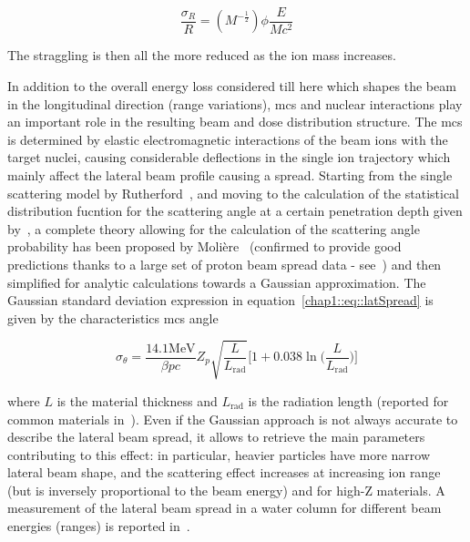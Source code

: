  \begin{equation}
\frac{\sigma_{R}}{R} = (M^{-\frac{1}{2}})\phi\frac{E}{Mc^{2}}
\label{chap1::eq::relStragg}
\end{equation}

The straggling is then all the more reduced as the ion mass increases.

In addition to the overall energy loss considered till here which shapes the beam in the longitudinal direction (range variations),  \gls{mcs} and nuclear interactions play an important role in the resulting beam and dose distribution structure. The \gls{mcs} is determined by elastic electromagnetic interactions of the beam ions with the target nuclei, causing considerable deflections in the single ion trajectory which mainly affect the lateral beam profile causing a spread. Starting from the single scattering model by Rutherford~\parencite{Rutherford1911}, and moving to the calculation of the statistical distribution fucntion for the scattering angle at a certain penetration depth given by~\cite{Bothe1921}, a complete theory allowing for the calculation of the scattering angle probability has been proposed by Moli\`{e}re~\parencite{Moliere1948} (confirmed to provide good predictions thanks to a large set of proton beam spread data - see~\cite{Gottschalk1993}) and then simplified for analytic calculations towards a Gaussian approximation. The Gaussian standard deviation expression in equation~\ref{chap1::eq::latSpread} is given by the characteristics \gls{mcs} angle~\parencite{Highland1975}

 \begin{equation}
\sigma_{\theta} = \frac{14.1 \mathrm{MeV}}{\beta p c}Z_{p}\sqrt{\frac{L}{L_\mathrm{rad}}}\big[1+0.038 \ln\big(\frac{L}{L_{\mathrm{rad}}}\big) \big]
\label{chap1::eq::latSpread}
\end{equation}

where $L$ is the material thickness and $L_{\mathrm{rad}}$ is the radiation length (reported for common materials in~\cite{Tsai1974}). Even if the Gaussian approach is not always accurate to describe the lateral beam spread,  it allows to retrieve the main parameters contributing to this effect: in particular, heavier particles have more narrow lateral beam shape, and the scattering effect increases at increasing ion range (but is inversely proportional to the beam energy) and for high-Z materials. A measurement of the lateral beam spread in a water column for different beam energies (ranges) is reported in~\cite{Pedroni2005}.

